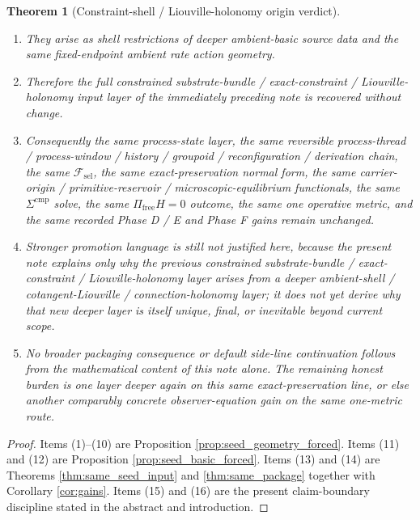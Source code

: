 \documentclass[11pt]{article}
\newcommand{\StemFunctional}{\mathscr F_{\mathrm{sel}}}
\newtheorem{theorem}{Theorem}
\begin{document}
\begin{theorem}[Constraint-shell / Liouville-holonomy origin verdict]
\begin{enumerate}
    \item They arise as shell restrictions of deeper ambient-basic source data and the same fixed-endpoint ambient rate action geometry.
    \item Therefore the full constrained substrate-bundle / exact-constraint / Liouville-holonomy input layer of the immediately preceding note is recovered without change.
    \item Consequently the same process-state layer, the same reversible process-thread / process-window / history / groupoid / reconfiguration / derivation chain, the same \(\StemFunctional\), the same exact-preservation normal form, the same carrier-origin / primitive-reservoir / microscopic-equilibrium functionals, the same \(\Sigma^{\mathrm{cmp}}\) solve, the same \(\Pi_{\mathrm{free}}H=0\) outcome, the same one operative metric, and the same recorded Phase D / E and Phase F gains remain unchanged.
    \item Stronger promotion language is still not justified here, because the present note explains only why the previous constrained substrate-bundle / exact-constraint / Liouville-holonomy layer arises from a deeper ambient-shell / cotangent-Liouville / connection-holonomy layer; it does not yet derive why that new deeper layer is itself unique, final, or inevitable beyond current scope.
    \item No broader packaging consequence or default side-line continuation follows from the mathematical content of this note alone. The remaining honest burden is one layer deeper again on this same exact-preservation line, or else another comparably concrete observer-equation gain on the same one-metric route.
\end{enumerate}
\end{theorem}

\begin{proof}
Items (1)--(10) are Proposition \ref{prop:seed_geometry_forced}. Items (11) and (12) are Proposition \ref{prop:seed_basic_forced}. Items (13) and (14) are Theorems \ref{thm:same_seed_input} and \ref{thm:same_package} together with Corollary \ref{cor:gains}. Items (15) and (16) are the present claim-boundary discipline stated in the abstract and introduction.
\end{proof}
\end{document}
